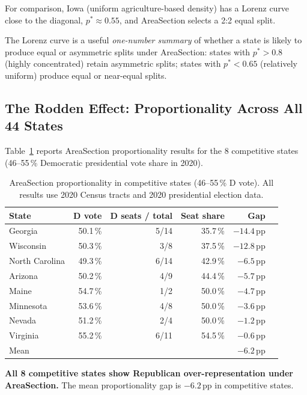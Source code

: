 For comparison, Iowa (uniform agriculture-based density) has a Lorenz curve
close to the diagonal, $p^* \approx 0.55$, and AreaSection selects a 2:2
equal split.

The Lorenz curve is a useful \emph{one-number summary} of whether a state is
likely to produce equal or asymmetric splits under AreaSection:
states with $p^* > 0.8$ (highly concentrated) retain asymmetric splits;
states with $p^* < 0.65$ (relatively uniform) produce equal or near-equal splits.

\subsection{The Rodden Effect: Proportionality Across All 44 States}

Table~\ref{tab:prop-competitive} reports AreaSection proportionality results
for the 8 competitive states (46--55\,\% Democratic presidential vote share
in 2020).

\begin{table}[h]
\centering
\caption{AreaSection proportionality in competitive states (46--55\,\% D vote).
All results use 2020 Census tracts and 2020 presidential election data.}
\label{tab:prop-competitive}
\begin{tabular}{lrrrrr}
\toprule
State & D vote & D seats / total & Seat share & Gap \\
\midrule
Georgia       & 50.1\,\% & 5/14 & 35.7\,\% & $-14.4$\,pp \\
Wisconsin     & 50.3\,\% & 3/8  & 37.5\,\% & $-12.8$\,pp \\
North Carolina & 49.3\,\% & 6/14 & 42.9\,\% & $-6.5$\,pp  \\
Arizona       & 50.2\,\% & 4/9  & 44.4\,\% & $-5.7$\,pp  \\
Maine         & 54.7\,\% & 1/2  & 50.0\,\% & $-4.7$\,pp  \\
Minnesota     & 53.6\,\% & 4/8  & 50.0\,\% & $-3.6$\,pp  \\
Nevada        & 51.2\,\% & 2/4  & 50.0\,\% & $-1.2$\,pp  \\
Virginia      & 55.2\,\% & 6/11 & 54.5\,\% & $-0.6$\,pp  \\
\midrule
Mean          &          &      &          & $-6.2$\,pp  \\
\bottomrule
\end{tabular}
\end{table}

\noindent\textbf{All 8 competitive states show Republican over-representation
under AreaSection.}
The mean proportionality gap is $-6.2$\,pp in competitive states.

